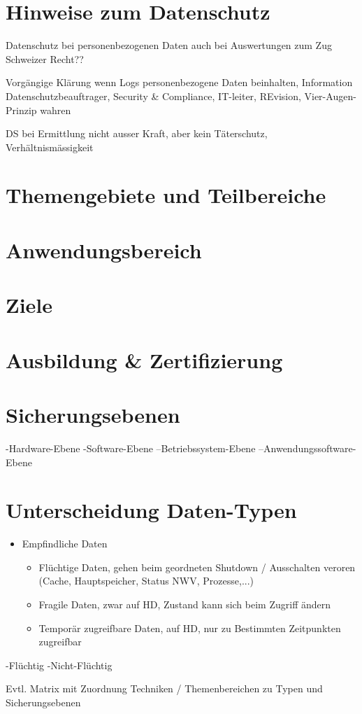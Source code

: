 \section{Hinweise zum Datenschutz}
Datenschutz bei personenbezogenen Daten auch bei Auswertungen zum Zug
Schweizer Recht??

Vorgängige Klärung wenn Logs personenbezogene Daten beinhalten, Information Datenschutzbeauftrager, Security \& Compliance, IT-leiter, REvision, Vier-Augen-Prinzip wahren

DS bei Ermittlung nicht ausser Kraft, aber kein Täterschutz, Verhältnismässigkeit
\section{Themengebiete und Teilbereiche}

\section{Anwendungsbereich}

\section{Ziele}

\section{Ausbildung \& Zertifizierung}


\section{Sicherungsebenen}
-Hardware-Ebene
-Software-Ebene
--Betriebssystem-Ebene
--Anwendungssoftware-Ebene

\section{Unterscheidung Daten-Typen}
\begin{itemize}
\item Empfindliche Daten
\begin{itemize}
\item Flüchtige Daten, gehen beim geordneten Shutdown / Ausschalten veroren (Cache, Hauptspeicher, Status NWV, Prozesse,...)
\item Fragile Daten, zwar auf HD, Zustand kann sich beim Zugriff ändern
\item Temporär zugreifbare Daten, auf HD, nur zu Bestimmten Zeitpunkten zugreifbar
\end{itemize}
\end{itemize}
-Flüchtig
-Nicht-Flüchtig

Evtl. Matrix mit Zuordnung Techniken / Themenbereichen zu Typen und Sicherungsebenen
